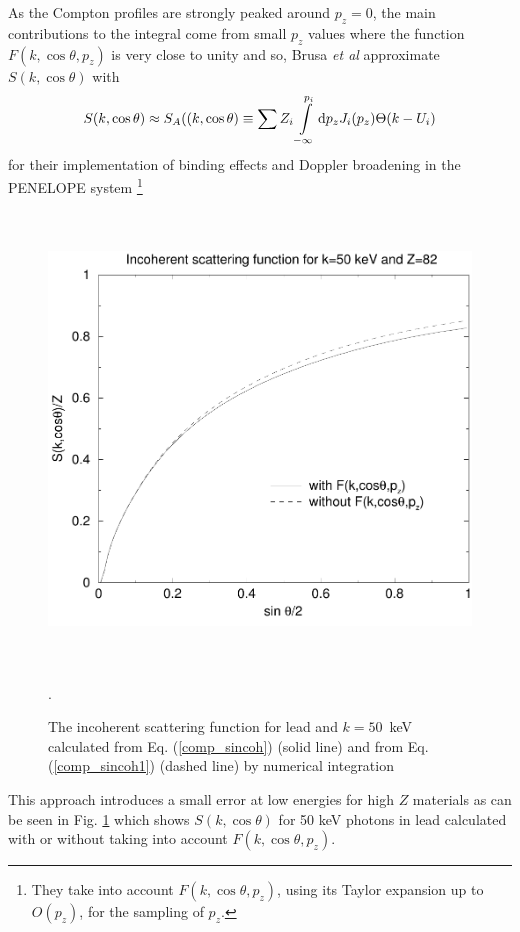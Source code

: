 As the Compton profiles are
strongly peaked around $p_z=0$, the main contributions
to the integral come from small $p_z$ values where
the function $F(k,\cos \theta, p_z)$ is very close
to unity and so, Brusa {\em et al} \cite{BS96} approximate
$S(k,\cos \theta)$ with
\begin{equation}
\label{comp_sincoh1}
S(k,\cos \theta) \approx S_A((k,\cos \theta) \equiv
\sum Z_i \int\limits_{-\infty}^{p_i} {\rm d} p_z J_i(p_z)
\Theta(k - U_i)
\end{equation}
for their implementation of binding effects and Doppler broadening
in the PENELOPE system \cite{Sa96}\footnote{They take
into account $F(k,\cos \theta, p_z)$, using its Taylor
expansion up to $O(p_z)$, for the sampling of $p_z$.}
\begin{figure}[h]
\includegraphics[height=12cm,width=12cm]{figures/sincoh}
\caption[Incoherent scattering function]{\label{comp_sincoh_fig}
The incoherent scattering function for lead and $k=50$~keV
calculated from Eq. (\protect\ref{comp_sincoh}) (solid line)
and from Eq. (\protect\ref{comp_sincoh1}) (dashed line)
by numerical integration}.
\end{figure}
This approach introduces a small error at low energies
for high $Z$ materials as can be seen
in Fig. \ref{comp_sincoh_fig} which shows
$S(k,\cos \theta)$ for 50 keV photons in lead calculated
with or without taking into account $F(k,\cos \theta, p_z)$.

